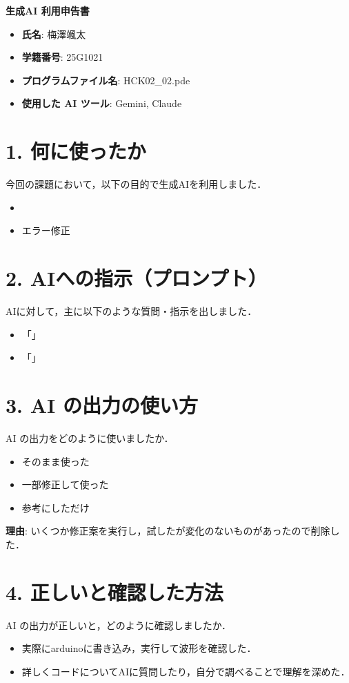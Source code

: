 \documentclass[a4paper,11pt]{jsarticle}
\begin{document}
{\Large \textbf{生成AI 利用申告書}}

\vspace{1em}

\begin{itemize}
    \item \textbf{氏名}: 梅澤颯太
    \item \textbf{学籍番号}: 25G1021
    \item \textbf{プログラムファイル名}: HCK02\_02.pde
    \item \textbf{使用した AI ツール}: Gemini, Claude
\end{itemize}

\section*{1. 何に使ったか}
今回の課題において，以下の目的で生成AIを利用しました．
\begin{itemize}
    \item
    \item エラー修正
\end{itemize}

\section*{2. AIへの指示（プロンプト）}
AIに対して，主に以下のような質問・指示を出しました．
\begin{itemize}
    \item 「」
    \item 「」
\end{itemize}

\section*{3. AI の出力の使い方}
AI の出力をどのように使いましたか．
\begin{itemize}
    \item[$\square$] そのまま使った
    \item[$\boxtimes$] 一部修正して使った
    \item[$\square$] 参考にしただけ
\end{itemize}
\textbf{理由}:
いくつか修正案を実行し，試したが変化のないものがあったので削除した．

\section*{4. 正しいと確認した方法}
AI の出力が正しいと，どのように確認しましたか．
\begin{itemize}
    \item 実際にarduinoに書き込み，実行して波形を確認した．
    \item 詳しくコードについてAIに質問したり，自分で調べることで理解を深めた．
\end{itemize}
\end{document}
